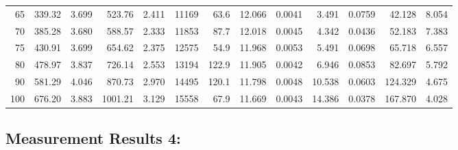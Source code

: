 \documentclass[10pt]{article}
\begin{document}
{\begin{tabular}{|r|rr|rr|rr|rr|rr|r|r|}
       65 &       339.32 &        3.699 &       523.76 &        2.411 &        11169 &         63.6 &       12.066 &       0.0041 &        3.491 &       0.0759 &       42.128 &        8.054 \\
       70 &       385.28 &        3.680 &       588.57 &        2.333 &        11853 &         87.7 &       12.018 &       0.0045 &        4.342 &       0.0436 &       52.183 &        7.383 \\
       75 &       430.91 &        3.699 &       654.62 &        2.375 &        12575 &         54.9 &       11.968 &       0.0053 &        5.491 &       0.0698 &       65.718 &        6.557 \\
       80 &       478.97 &        3.837 &       726.14 &        2.553 &        13194 &        122.9 &       11.905 &       0.0042 &        6.946 &       0.0853 &       82.697 &        5.792 \\
       90 &       581.29 &        4.046 &       870.73 &        2.970 &        14495 &        120.1 &       11.798 &       0.0048 &       10.538 &       0.0603 &      124.329 &        4.675 \\
      100 &       676.20 &        3.883 &      1001.21 &        3.129 &        15558 &         67.9 &       11.669 &       0.0043 &       14.386 &       0.0378 &      167.870 &        4.028 \\
\hline
\end{tabular}
}



\subsection*{\large \bf Measurement Results 4:}
\end{document}
